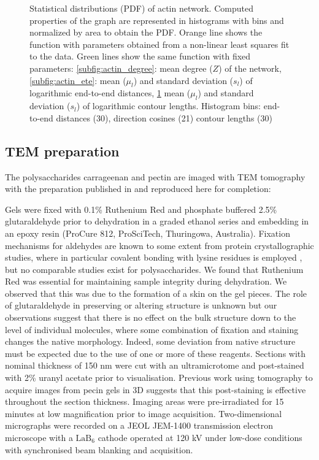 \begin{figure}[H]
\begin{subfigure}{0.5\textwidth}
    \label{subfig:actin_contour}
  \end{subfigure}
  \caption{Statistical distributions (PDF) of actin network. Computed properties of the graph are represented in histograms with bins and normalized by area to obtain the PDF. Orange line shows the function with parameters obtained from a non-linear least squares fit to the data.
    Green lines show the same function with fixed parameters: \ref{subfig:actin_degree}: mean degree ($Z$) of the network, \ref{subfig:actin_ete}: mean ($\mu_l$) and standard deviation ($s_l$) of logarithmic end-to-end distances,
  \ref{subfig:actin_contour} mean ($\mu_l$) and standard deviation ($s_l$) of logarithmic contour lengths.
Histogram bins: end-to-end distances (30), direction cosines (21) contour lengths (30) }
  \label{fig:actin_thin}
\end{figure}

\subsection{TEM preparation}%
\label{sub:tem_preparation}

The polysaccharides carrageenan and pectin are imaged with \gls{TEM} tomography with the preparation published in \citep{hernandez-cerdan_structural_2018-2} and reproduced here for completion:

Gels were fixed with 0.1\% Ruthenium Red and phosphate buffered 2.5\% glutaraldehyde prior to dehydration in a graded ethanol series and embedding in an epoxy resin (ProCure 812, ProSciTech, Thuringowa, Australia). Fixation mechanisms for aldehydes are known to some extent from protein crystallographic studies, where in particular covalent bonding with lysine residues is employed \cite{wine_elucidation_2007}, but no comparable studies exist for polysaccharides. We found that Ruthenium Red \cite{sterling_crystal-structure_1970} was essential for maintaining sample integrity during dehydration. We observed that this was due to the formation of a skin on the gel pieces. The role of glutaraldehyde in preserving or altering structure is unknown but our observations suggest that there is no effect on the bulk structure down to the level of individual molecules, where some combination of fixation and staining changes the native morphology. Indeed, some deviation from native structure must be expected due to the use of one or more of these reagents. Sections with nominal thickness of 150 nm were cut with an ultramicrotome and post-stained with 2\% uranyl acetate prior to visualisation. Previous work using tomography to acquire images from pecin gels in 3D \cite{mansel_zooming_2015} suggests that this post-staining is effective throughout the section thickness. Imaging areas were pre-irradiated for 15 minutes at low magnification prior to image acquisition. Two-dimensional micrographs were recorded on a JEOL JEM-1400 transmission electron microscope with a $\text{LaB}_6$ cathode operated at 120 kV under low-dose conditions with synchronised beam blanking and acquisition.

